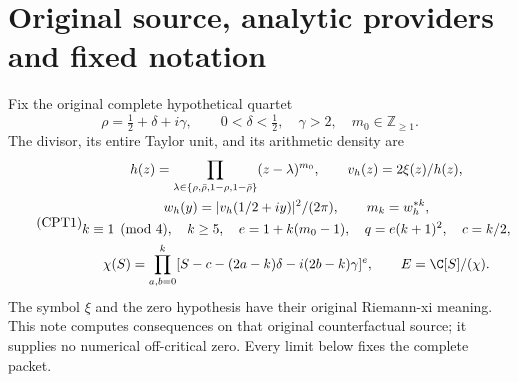 \begin{abstract}
The full two-parameter arithmetic source interpolation has a uniformly
small central derivative on every specified complete annihilator
polynomial space.  Its explicit derivative bound is the product of the
original logarithmic density contrast and the central localization
fraction.  Integrating this derivative proves exponential relative
metric bounds and an explicit bound for the actual minimum sections.
For the complete relation ideal this gives a finite central-leg error
and a finite rectangle error in the original four-endpoint signed
determinant.  The remaining source-band interaction is expressed by its
exact two-variable reproducing-kernel integral.  Every statement retains
the full primary orders, original physical coordinate, original
polynomial remainder map, complete real integration domain and both
endpoint multiplicities.
\end{abstract}

\section{Original source, analytic providers and fixed notation}

Fix the original complete hypothetical quartet
\[
 \rho=\tfrac12+\delta+i\gamma,\qquad
 0<\delta<\tfrac12,\quad\gamma>2,\quad m_0\in\mathbb Z_{\ge1}.
\]
The divisor, its entire Taylor unit, and its arithmetic density are
\begin{equation}\tag{CPT1}
\begin{gathered}
 h(z)=\prod_{\lambda\in\{\rho,\bar\rho,1-\rho,1-\bar\rho\}}
             (z-\lambda)^{m_0},\qquad
 v_h(z)=2\xi(z)/h(z),\\
 w_h(y)=|v_h(1/2+iy)|^2/(2\pi),\qquad m_k=w_h^{*k},\\
 k\equiv1\pmod4,\quad k\ge5,\quad
 e=1+k(m_0-1),\quad q=e(k+1)^2,\quad c=k/2,\\
 \chi(S)=\prod_{a,b=0}^k
  [S-c-(2a-k)\delta-i(2b-k)\gamma]^e,\qquad
 E=\C[S]/(\chi).
\end{gathered}
\end{equation}
The symbol \(\xi\) and the zero hypothesis have their original
Riemann-xi meaning.  This note computes consequences on that original
counterfactual source; it supplies no numerical off-critical zero.
Every limit below fixes the complete packet.

